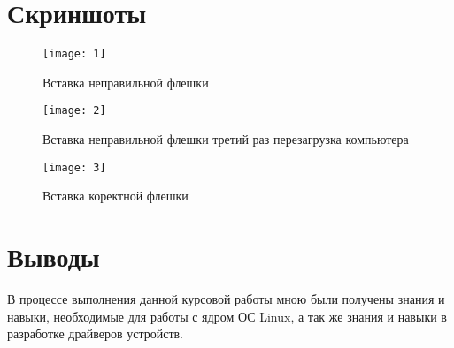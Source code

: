 \documentclass[a4paper]{article}
\begin{document}
\section{Скриншоты}
\begin{figure}[htbp]
  \centering
  \texttt{[image: 1]}
  \caption{Вставка неправильной флешки}\label{fig:1}
\end{figure}

\begin{figure}[htbp]
  \centering
  \texttt{[image: 2]}
  \caption{Вставка неправильной флешки третий раз перезагрузка компьютера}\label{fig:1}
\end{figure}

\begin{figure}[htbp]
  \centering
  \texttt{[image: 3]}
  \caption{Вставка коректной флешки}\label{fig:1}
\end{figure}

\section{Выводы}
	В процессе выполнения данной курсовой работы мною были получены знания и навыки, необходимые для работы с ядром ОС Linux, а так же знания и навыки в разработке драйверов устройств.
\newpage
\end{document}

